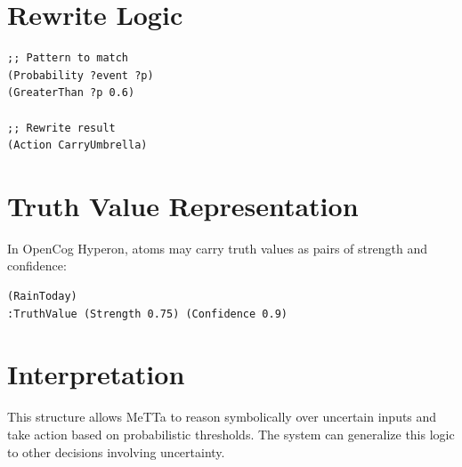 \documentclass{article}
\begin{document}
\section{Rewrite Logic}

\begin{verbatim}
;; Pattern to match
(Probability ?event ?p)
(GreaterThan ?p 0.6)

;; Rewrite result
(Action CarryUmbrella)
\end{verbatim}

\section{Truth Value Representation}

In OpenCog Hyperon, atoms may carry truth values as pairs of strength and confidence:

\begin{verbatim}
(RainToday)
:TruthValue (Strength 0.75) (Confidence 0.9)
\end{verbatim}

\section*{Interpretation}
This structure allows MeTTa to reason symbolically over uncertain inputs and take action based on probabilistic thresholds. The system can generalize this logic to other decisions involving uncertainty.



\end{document}
